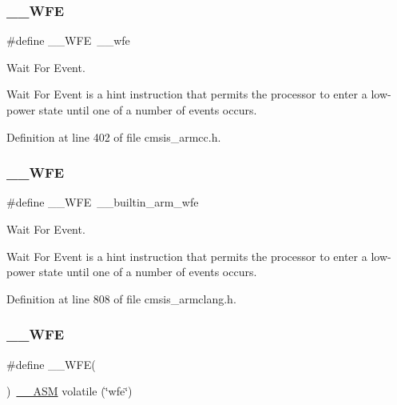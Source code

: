 \subsubsection{\texorpdfstring{\+\_\+\+\_\+\+W\+FE}{\_\_WFE}\hspace{0.1cm}{\footnotesize\ttfamily [1/3]}}
{\footnotesize\ttfamily \#define \+\_\+\+\_\+\+W\+FE~\+\_\+\+\_\+wfe}



Wait For Event. 

Wait For Event is a hint instruction that permits the processor to enter a low-\/power state until one of a number of events occurs. 

Definition at line 402 of file cmsis\+\_\+armcc.\+h.

\mbox{\label{group___c_m_s_i_s___core___instruction_interface_gaac6cc7dd4325d9cb40d3290fa5244b3d}} 
\subsubsection{\texorpdfstring{\+\_\+\+\_\+\+W\+FE}{\_\_WFE}\hspace{0.1cm}{\footnotesize\ttfamily [2/3]}}
{\footnotesize\ttfamily \#define \+\_\+\+\_\+\+W\+FE~\+\_\+\+\_\+builtin\+\_\+arm\+\_\+wfe}



Wait For Event. 

Wait For Event is a hint instruction that permits the processor to enter a low-\/power state until one of a number of events occurs. 

Definition at line 808 of file cmsis\+\_\+armclang.\+h.

\mbox{\label{group___c_m_s_i_s___core___instruction_interface_gaf0330712223f4cfb6091e4ab84775f73}} 
\subsubsection{\texorpdfstring{\+\_\+\+\_\+\+W\+FE}{\_\_WFE}\hspace{0.1cm}{\footnotesize\ttfamily [3/3]}}
{\footnotesize\ttfamily \#define \+\_\+\+\_\+\+W\+FE(\begin{DoxyParamCaption}{ }\end{DoxyParamCaption})~\hyperlink{cmsis__iccarm_8h_a1378040bcf22428955c6e3ce9c2053cd}{\+\_\+\+\_\+\+A\+SM} volatile (\char`\"{}wfe\char`\"{})}



